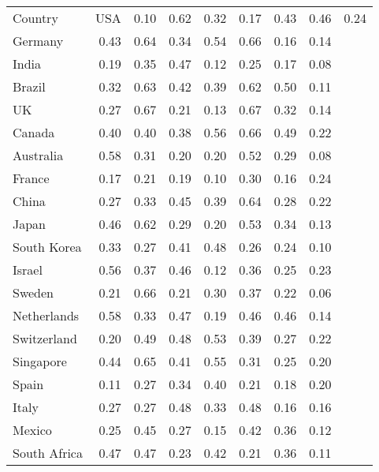 \begin{tabular}{lrrrrrrr}
  \toprule
Country & %
  \midrule
USA & 0.10 & 0.62 & 0.32 & 0.17 & 0.43 & 0.46 & 0.24 \\ 
  Germany & 0.43 & 0.64 & 0.34 & 0.54 & 0.66 & 0.16 & 0.14 \\ 
  India & 0.19 & 0.35 & 0.47 & 0.12 & 0.25 & 0.17 & 0.08 \\ 
  Brazil & 0.32 & 0.63 & 0.42 & 0.39 & 0.62 & 0.50 & 0.11 \\ 
  UK & 0.27 & 0.67 & 0.21 & 0.13 & 0.67 & 0.32 & 0.14 \\ 
  Canada & 0.40 & 0.40 & 0.38 & 0.56 & 0.66 & 0.49 & 0.22 \\ 
  Australia & 0.58 & 0.31 & 0.20 & 0.20 & 0.52 & 0.29 & 0.08 \\ 
  France & 0.17 & 0.21 & 0.19 & 0.10 & 0.30 & 0.16 & 0.24 \\ 
  China & 0.27 & 0.33 & 0.45 & 0.39 & 0.64 & 0.28 & 0.22 \\ 
  Japan & 0.46 & 0.62 & 0.29 & 0.20 & 0.53 & 0.34 & 0.13 \\ 
  South Korea & 0.33 & 0.27 & 0.41 & 0.48 & 0.26 & 0.24 & 0.10 \\ 
  Israel & 0.56 & 0.37 & 0.46 & 0.12 & 0.36 & 0.25 & 0.23 \\ 
  Sweden & 0.21 & 0.66 & 0.21 & 0.30 & 0.37 & 0.22 & 0.06 \\ 
  Netherlands & 0.58 & 0.33 & 0.47 & 0.19 & 0.46 & 0.46 & 0.14 \\ 
  Switzerland & 0.20 & 0.49 & 0.48 & 0.53 & 0.39 & 0.27 & 0.22 \\ 
  Singapore & 0.44 & 0.65 & 0.41 & 0.55 & 0.31 & 0.25 & 0.20 \\ 
  Spain & 0.11 & 0.27 & 0.34 & 0.40 & 0.21 & 0.18 & 0.20 \\ 
  Italy & 0.27 & 0.27 & 0.48 & 0.33 & 0.48 & 0.16 & 0.16 \\ 
  Mexico & 0.25 & 0.45 & 0.27 & 0.15 & 0.42 & 0.36 & 0.12 \\ 
  South Africa & 0.47 & 0.47 & 0.23 & 0.42 & 0.21 & 0.36 & 0.11 \\ 
   \bottomrule
\end{tabular}
